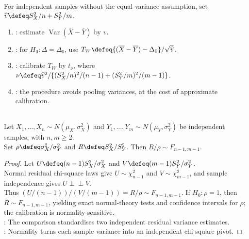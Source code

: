 \begin{method} \label{meth:welch-two-sample-test} \\
For independent samples without the equal-variance assumption, set $\widehat{v}\defeq S_X^2/n+S_Y^2/m$.
\begin{enumerate}[label=(\roman*)]
\setlength{\itemsep}{0pt}
\item {}: estimate $\operatorname{Var}(\overline{X}-\overline{Y})$ by $\widehat{v}$.
\item {}: for $H_0:\Delta=\Delta_0$, use $T_W\defeq\{(\overline{X}-\overline{Y})-\Delta_0\}/\sqrt{\widehat{v}}$.
\item {}: calibrate $T_W$ by $t_\nu$, where $\nu\defeq\widehat{v}^2/\{(S_X^2/n)^2/(n-1)+(S_Y^2/m)^2/(m-1)\}$.
\item {}: the procedure avoids pooling variances, at the cost of approximate calibration.
\end{enumerate}
\end{method}

\begin{corollary} \label{cor:two-normal-sample-variance-ratio-f} \\
Let $X_1,\ldots,X_n\sim N(\mu_X,\sigma_X^2)$ and $Y_1,\ldots,Y_m\sim N(\mu_Y,\sigma_Y^2)$ be independent samples, with $n,m\geq2$.\\
Set $\rho\defeq\sigma_X^2/\sigma_Y^2$ and $R\defeq S_X^2/S_Y^2$. Then $R/\rho\sim F_{n-1,m-1}$.
\begin{proof} Let $U\defeq(n-1)S_X^2/\sigma_X^2$ and $V\defeq(m-1)S_Y^2/\sigma_Y^2$.\\
Normal residual chi-square laws give $U\sim\chi^2_{n-1}$ and $V\sim\chi^2_{m-1}$, and sample independence gives $U\perp\!\!\!\perp V$.\\
Thus $(U/(n-1))/(V/(m-1))=R/\rho\sim F_{n-1,m-1}$. If $H_0:\rho=1$, then $R\sim F_{n-1,m-1}$, yielding exact normal-theory tests and confidence intervals for $\rho$; the calibration is normality-sensitive.\\
: The comparison standardises two independent residual variance estimates.\\
: Normality turns each sample variance into an independent chi-square pivot.
\end{proof}
\end{corollary}

